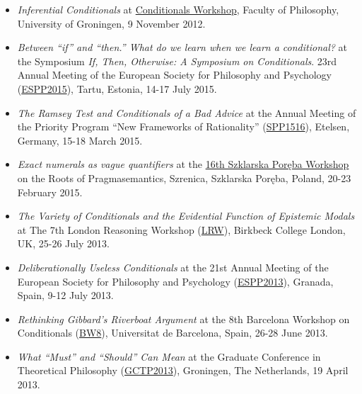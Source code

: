 \documentclass[a4paper,12pt]{article}
\begin{document}
\begin{small}
\begin{itemize}
    \item \emph{Inferential Conditionals} at
    \href{https://sites.google.com/site/jannekehuitink/workshop}{Conditionals Workshop}, Faculty of Philosophy, University of Groningen, 9 November 2012.
  \end{itemize}
  
  \begin{itemize}
    \item \emph{Between ``if'' and ``then.'' What do we learn when we learn a conditional?} at the Symposium \emph{If, Then, Otherwise: A Symposium on Conditionals}. 23rd Annual Meeting of the European Society for Philosophy and Psychology (\href{http://espp2015.ut.ee}{ESPP2015}), Tartu, Estonia, 14-17 July 2015.

    \item \emph{The Ramsey Test and Conditionals of a Bad Advice} at the Annual Meeting of the Priority Program ``New Frameworks of Rationality'' (\href{http://www.spp1516.de}{SPP1516}), Etelsen, Germany, 15-18 March 2015.

    \item \emph{Exact numerals as vague quantifiers} at the \href{https://sites.google.com/site/szklarskaporebaworkshop16/}{16th Szklarska Poręba Workshop} on the Roots of Pragmasemantics, Szrenica, Szklarska Poręba, Poland, 20-23 February 2015.

    \item \emph{The Variety of Conditionals and the Evidential Function of Epistemic Modals} at The 7th London Reasoning Workshop (\href{http://www.bbk.ac.uk/psychology/about-us/events/the-7th-london-reasoning-workshop}{LRW}), Birkbeck College London, UK, 25-26 July 2013.

    \item \emph{Deliberationally Useless Conditionals} at the 21st Annual Meeting of the European Society for Philosophy and Psychology (\href{http://espp2013.com}{ESPP2013}), Granada, Spain, 9-12 July 2013.

    \item \emph{Rethinking Gibbard’s Riverboat Argument} at the 8th Barcelona Workshop on Conditionals
    (\href{http://www.ub.edu/logosbw/bw8/index.html}{BW8}), Universitat de Barcelona, Spain, 26-28 June 2013.
    
    \item \emph{What ``Must'' and ``Should'' Can Mean} at the Graduate Conference in Theoretical Philosophy
    (\href{http://www.philos.rug.nl/GCTP2013/}{GCTP2013}), Groningen, The Netherlands, 19 April 2013. 
    

\end{itemize}
\end{small}
\end{document}

